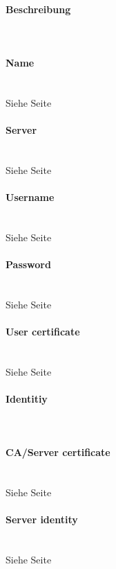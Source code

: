 \begin{minipage}[t]{0.5\textwidth}
\vspace{0pt}
\paragraph{Beschreibung}\mbox{}\\
\paragraph{Name}\mbox{}\\
Siehe Seite \pageref{name} \\

\paragraph{Server}\mbox{}\\
Siehe Seite \pageref{server} \\

\paragraph{Username}\mbox{}\\
Siehe Seite \pageref{username} \\

\paragraph{Password}\mbox{}\\
Siehe Seite \pageref{password} \\

\paragraph{User certificate}\mbox{}\\
Siehe Seite \pageref{usercertificate} \\

\paragraph{Identitiy}\label{identitiy}\mbox{}\\
\paragraph{CA/Server certificate}\mbox{}\\
Siehe Seite \pageref{servercertificate} \\

\paragraph{Server identity}\mbox{}\\
Siehe Seite \pageref{serveridentitiy} \\

\end{minipage}
\newpage

